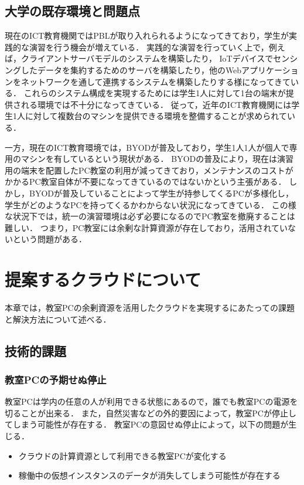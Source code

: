 \documentclass[11pt,a4paper]{jsarticle}
\begin{document}
\subsection{大学の既存環境と問題点}
現在のICT教育機関ではPBLが取り入れられるようになってきており，学生が実践的な演習を行う機会が増えている．
実践的な演習を行っていく上で，例えば，クライアントサーバモデルのシステムを構築したり，
IoTデバイスでセンシングしたデータを集約するためのサーバを構築したり，他のWebアプリケーションをネットワークを通して連携するシステムを構築したりする様になってきている．
これらのシステム構成を実現するためには学生1人に対して1台の端末が提供される環境では不十分になってきている．
従って，近年のICT教育機関には学生1人に対して複数台のマシンを提供できる環境を整備することが求められている．
\par 一方，現在のICT教育環境では，BYODが普及しており，学生1人1人が個人で専用のマシンを有しているという現状がある．
BYODの普及により，現在は演習用の端末を配置したPC教室の利用が減ってきており，メンテナンスのコストがかかるPC教室自体が不要になってきているのではないかという主張がある．
しかし，BYODが普及していることによって学生が持参してくるPCが多様化し，学生がどのようなPCを持ってくるかわからない状況になってきている．
この様な状況下では，統一の演習環境は必ず必要になるのでPC教室を撤廃することは難しい．
つまり，PC教室には余剰な計算資源が存在しており，活用されていないという問題がある．

\section{提案するクラウドについて}
本章では，教室PCの余剰資源を活用したクラウドを実現するにあたっての課題と解決方法について述べる．
\subsection{技術的課題}
\subsubsection{教室PCの予期せぬ停止}
教室PCは学内の任意の人が利用できる状態にあるので，誰でも教室PCの電源を切ることが出来る．
また，自然災害などの外的要因によって，教室PCが停止してしまう可能性が存在する．
教室PCの意図せぬ停止によって，以下の問題が生じる．
\begin{itemize}
	\item クラウドの計算資源として利用できる教室PCが変化する
	\item 稼働中の仮想インスタンスのデータが消失してしまう可能性が存在する
\end{itemize}
\end{document}

